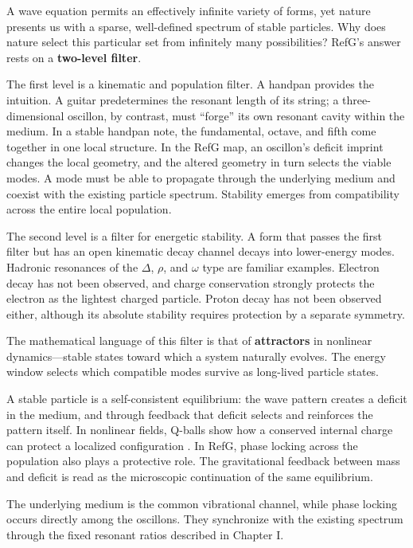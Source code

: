 \documentclass[11pt,a4paper]{article}
\begin{document}
A wave equation permits an effectively infinite variety of forms, yet nature presents us with a sparse, well-defined spectrum of stable particles. Why does nature select this particular set from infinitely many possibilities? RefG's answer rests on a \textbf{two-level filter}.

The first level is a kinematic and population filter. A handpan provides the intuition. A guitar predetermines the resonant length of its string; a three-dimensional oscillon, by contrast, must ``forge'' its own resonant cavity within the medium. In a stable handpan note, the fundamental, octave, and fifth come together in one local structure. In the RefG map, an oscillon's deficit imprint changes the local geometry, and the altered geometry in turn selects the viable modes. A mode must be able to propagate through the underlying medium and coexist with the existing particle spectrum. Stability emerges from compatibility across the entire local population.

The second level is a filter for energetic stability. A form that passes the first filter but has an open kinematic decay channel decays into lower-energy modes. Hadronic resonances of the $\Delta$, $\rho$, and $\omega$ type are familiar examples. Electron decay has not been observed, and charge conservation strongly protects the electron as the lightest charged particle. Proton decay has not been observed either, although its absolute stability requires protection by a separate symmetry.

The mathematical language of this filter is that of \textbf{attractors} in nonlinear dynamics---stable states toward which a system naturally evolves. The energy window selects which compatible modes survive as long-lived particle states.

A stable particle is a self-consistent equilibrium: the wave pattern creates a deficit in the medium, and through feedback that deficit selects and reinforces the pattern itself. In nonlinear fields, Q-balls show how a conserved internal charge can protect a localized configuration \citep{coleman1985}. In RefG, phase locking across the population also plays a protective role. The gravitational feedback between mass and deficit is read as the microscopic continuation of the same equilibrium.

The underlying medium is the common vibrational channel, while phase locking occurs directly among the oscillons. They synchronize with the existing spectrum through the fixed resonant ratios described in Chapter I.
\end{document}
